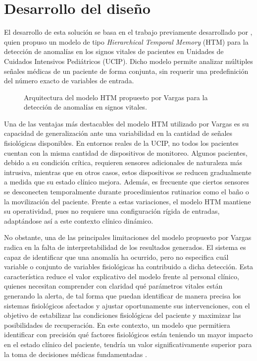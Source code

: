 \chapter{Desarrollo del diseño}

El desarrollo de esta solución se basa en el trabajo previamente desarrollado por \textcite{Vargas2023}, quien propuso un modelo de tipo \textit{Hierarchical Temporal Memory }(HTM) para la detección de anomalías en los signos vitales de pacientes en Unidades de Cuidados Intensivos Pediátricos (UCIP). Dicho modelo permite analizar múltiples señales médicas de un paciente de forma conjunta, sin requerir una predefinición del número exacto de variables de entrada.

\begin{figure}[ht]
  \centering
  
  \captionsetup{justification=centering}
  \caption{Arquitectura del modelo HTM propuesto por Vargas para la detección de anomalías en signos vitales.}
  \label{fig:arquitectura_original}
\end{figure}

Una de las ventajas más destacables del modelo HTM utilizado por Vargas es su capacidad de generalización ante una variabilidad en la cantidad de señales fisiológicas disponibles. En entornos reales de la UCIP, no todos los pacientes cuentan con la misma cantidad de dispositivos de monitoreo. Algunos pacientes, debido a su condición crítica, requieren sensores adicionales de naturaleza más intrusiva, mientras que en otros casos, estos dispositivos se reducen gradualmente a medida que su estado clínico mejora. Además, es frecuente que ciertos sensores se desconecten temporalmente durante procedimientos rutinarios como el baño o la movilización del paciente. Frente a estas variaciones, el modelo HTM mantiene su operatividad, pues no requiere una configuración rígida de entradas, adaptándose así a este contexto clínico dinámico.

No obstante, una de las principales limitaciones del modelo propuesto por Vargas radica en la falta de interpretabilidad de los resultados generados. El sistema es capaz de identificar que una anomalía ha ocurrido, pero no especifica cuál variable o conjunto de variables fisiológicas ha contribuido a dicha detección. Esta característica reduce el valor explicativo del modelo frente al personal clínico, quienes necesitan comprender con claridad qué parámetros vitales están generando la alerta, de tal forma que puedan identificar de manera precisa los sistemas fisiológicos afectados y ajustar oportunamente sus intervenciones, con el objetivo de estabilizar las condiciones fisiológicas del paciente y maximizar las posibilidades de recuperación. En este contexto, un modelo que permitiera identificar con precisión qué factores fisiológicos están teniendo un mayor impacto en el estado clínico del paciente, tendría un valor significativamente superior para la toma de decisiones médicas fundamentadas \parencite{zhang2023interpretable}.

